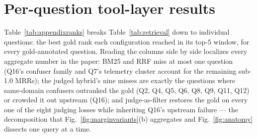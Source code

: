\appendix
\setcounter{table}{0}
\section{Per-question tool-layer results}
\label{app:perq}
Table~\ref{tab:appendixranks} breaks Table~\ref{tab:retrieval} down to
individual questions: the best gold rank each configuration reached in
its top-5 window, for every gold-annotated question. Reading the columns
side by side localizes every aggregate number in the paper: BM25 and RRF
miss at most one question (Q16's confuser family and Q7's telemetry
cluster account for the remaining sub-1.0 MRRs); the judged hybrid's nine
misses are exactly the questions where same-domain confusers outranked
the gold (Q2, Q4, Q5, Q6, Q8, Q9, Q11, Q12) or crowded it out upstream
(Q16); and judge-as-filter restores the gold on every one of the eight
judging losses while inheriting Q16's upstream failure --- the
decomposition that Fig.~\ref{fig:marginvariants}(b) aggregates and
Fig.~\ref{fig:anatomy} dissects one query at a time.







